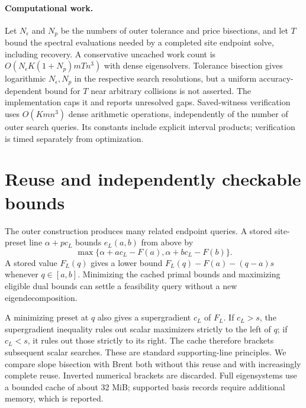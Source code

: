 \documentclass[11pt]{article}
\begin{document}
\paragraph{Computational work.}
Let $N_\epsilon$ and $N_p$ be the numbers of outer tolerance and price
bisections, and let $T$ bound the spectral evaluations needed by a completed
site endpoint solve, including recovery. A conservative uncached work count
is $O(N_\epsilon K(1+N_p)mTn^3)$ with dense eigensolvers. Tolerance bisection
gives logarithmic $N_\epsilon,N_p$ in the respective search resolutions,
but a uniform accuracy-dependent bound for $T$ near arbitrary collisions
is not asserted. The implementation caps it and reports unresolved gaps.
Saved-witness verification uses $O(Kmn^3)$ dense arithmetic operations,
independently of the number of outer search queries. Its constants include
explicit interval products; verification is timed separately from optimization.

\section{Reuse and independently checkable bounds}
The outer construction produces many related endpoint queries. A stored
site-preset line $\alpha+pc_L$ bounds $e_L(a,b)$ from above by
\begin{equation}
 \max\{\alpha+ac_L-F(a),\alpha+bc_L-F(b)\}.                 \label{eq:cachedprimal}
\end{equation}
A stored value $F_L(q)$ gives a lower bound
$F_L(q)-F(a)-(q-a)s$ whenever $q\in[a,b]$. Minimizing the cached primal
bounds and maximizing eligible dual bounds can settle a feasibility query
without a new eigendecomposition.

A minimizing preset at $q$ also gives a supergradient $c_L$ of $F_L$.
If $c_L>s$, the supergradient inequality rules out scalar maximizers strictly
to the left of $q$; if $c_L<s$, it rules out those strictly to its right.
The cache therefore brackets subsequent scalar searches. These are standard
supporting-line principles. We compare slope bisection with Brent both
without this reuse and with increasingly complete reuse. Inverted numerical
brackets are discarded. Full eigensystems use a bounded cache of about
32 MiB; supported basis records require additional memory, which is reported.
\end{document}
